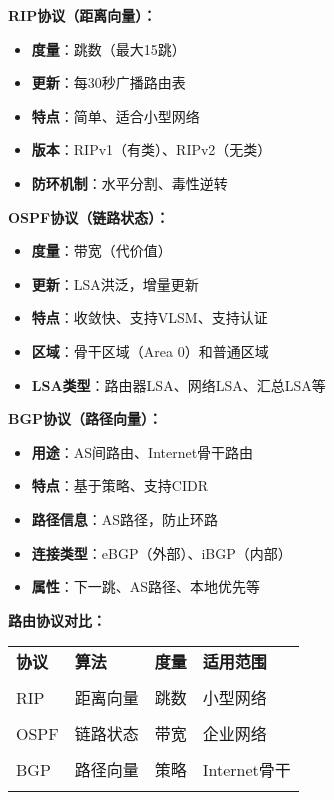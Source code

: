 \documentclass[lang=cn,newtx,10pt,scheme=chinese]{../../elegantbook}
\begin{document}
\textbf{RIP协议（距离向量）：}
\begin{itemize}
  \item \textbf{度量}：跳数（最大15跳）
  \item \textbf{更新}：每30秒广播路由表
  \item \textbf{特点}：简单、适合小型网络
  \item \textbf{版本}：RIPv1（有类）、RIPv2（无类）
  \item \textbf{防环机制}：水平分割、毒性逆转
\end{itemize}

\textbf{OSPF协议（链路状态）：}
\begin{itemize}
  \item \textbf{度量}：带宽（代价值）
  \item \textbf{更新}：LSA洪泛，增量更新
  \item \textbf{特点}：收敛快、支持VLSM、支持认证
  \item \textbf{区域}：骨干区域（Area 0）和普通区域
  \item \textbf{LSA类型}：路由器LSA、网络LSA、汇总LSA等
\end{itemize}

\textbf{BGP协议（路径向量）：}
\begin{itemize}
  \item \textbf{用途}：AS间路由、Internet骨干路由
  \item \textbf{特点}：基于策略、支持CIDR
  \item \textbf{路径信息}：AS路径，防止环路
  \item \textbf{连接类型}：eBGP（外部）、iBGP（内部）
  \item \textbf{属性}：下一跳、AS路径、本地优先等
\end{itemize}

\textbf{路由协议对比：}
\begin{longtable}{@{}p{2cm}p{3cm}p{3cm}p{4cm}@{}}
\toprule
\textbf{协议} & \textbf{算法} & \textbf{度量} & \textbf{适用范围} \\\\ \midrule
\endhead

RIP & 距离向量 & 跳数 & 小型网络 \\\\
OSPF & 链路状态 & 带宽 & 企业网络 \\\\
BGP & 路径向量 & 策略 & Internet骨干 \\\\

\bottomrule
\end{longtable}
\end{document}
